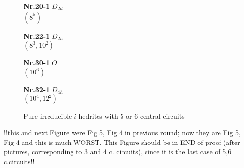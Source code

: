 \documentclass[12pt]{article}
\newtheorem{theorem}{Theorem}
\begin{document}
%





\begin{figure}
{\small
\setlength{\unitlength}{1cm}
\begin{minipage}[t]{3.5cm}
\centering
\epsfxsize=2.5cm
\par
{{\bf Nr.20-1} \quad $D_{2d}$ \\ $(8^5)$ \\ }
\end{minipage}
\begin{minipage}[t]{3.5cm}
\centering
\epsfxsize=2.5cm
\par
{{\bf Nr.22-1} \quad $D_{2h}$ \\ $(8^3,10^2)$ \\ }
\end{minipage}
\setlength{\unitlength}{1cm}
\begin{minipage}[t]{3.5cm}
\centering
\epsfxsize=2.3cm
\par
{{\bf Nr.30-1} \quad $O$ \\ $(10^6)$ \\}
\end{minipage}
\setlength{\unitlength}{1cm}
\begin{minipage}[t]{3.5cm}
\centering
\epsfxsize=2.3cm
\par
{{\bf Nr.32-1} \quad $D_{4h}$ \\ $(10^4,12^2)$ \\}
\end{minipage}
}
\caption{Pure irreducible $i$-hedrites with $5$ or $6$ central circuits}
\label{ThePureIrreducibleOctahedriteWith56CC}
\end{figure}
!!this and next Figure were Fig 5, Fig 4 in previous round; now they are
Fig 5, Fig 4 and this is much WORST. This Figure should be in END of
proof (after pictures, corresponding to 3 and 4 c. circuits), since it is the last case of 5,6 c.circuits!!
\end{document}
